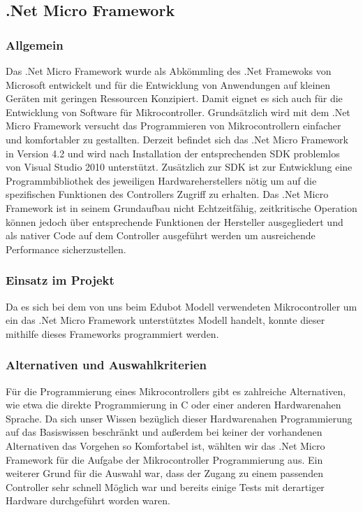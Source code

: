 \subsection{.Net Micro Framework}
\subsubsection{Allgemein}
Das .Net Micro Framework wurde als Abkömmling des .Net Framewoks von Microsoft entwickelt und für die Entwicklung von Anwendungen auf kleinen Geräten mit geringen Ressourcen Konzipiert. Damit eignet es sich auch für die Entwicklung von Software für Mikrocontroller. Grundsätzlich wird mit dem .Net Micro Framework versucht das Programmieren von Mikrocontrollern einfacher und komfortabler zu gestallten. Derzeit befindet sich das .Net Micro Framework in Version 4.2 und wird nach Installation der entsprechenden SDK problemlos von Visual Studio 2010 unterstützt. 
Zusätzlich zur SDK ist zur Entwicklung eine Programmbibliothek des jeweiligen Hardwareherstellers nötig um auf die spezifischen Funktionen des Controllers Zugriff zu erhalten.
Das .Net Micro Framework ist in seinem Grundaufbau nicht Echtzeitfähig, zeitkritische Operation können jedoch über entsprechende Funktionen der Hersteller ausgegliedert und als nativer Code auf dem Controller ausgeführt werden um ausreichende Performance sicherzustellen. 
\subsubsection{Einsatz im Projekt}
Da es sich bei dem von uns beim Edubot Modell verwendeten Mikrocontroller um ein das .Net Micro Framework unterstütztes Modell handelt, konnte dieser mithilfe dieses Frameworks programmiert werden. 
\subsubsection{Alternativen und Auswahlkriterien}
Für die Programmierung eines Mikrocontrollers gibt es zahlreiche Alternativen, wie etwa die direkte Programmierung in C oder einer anderen Hardwarenahen Sprache. Da sich unser Wissen bezüglich dieser Hardwarenahen Programmierung auf das Basiswissen beschränkt und außerdem bei keiner der vorhandenen Alternativen das Vorgehen so Komfortabel ist, wählten wir das .Net Micro Framework für die Aufgabe der Mikrocontroller Programmierung aus. 
Ein weiterer Grund für die Auswahl war, dass der Zugang zu einem passenden Controller sehr schnell Möglich war und bereits einige Tests mit derartiger Hardware durchgeführt worden waren.
